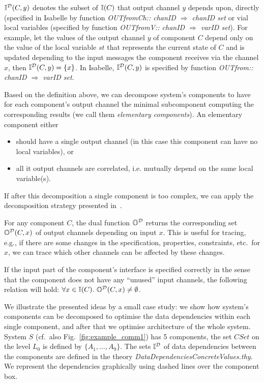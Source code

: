 $\mathbb{I}^\mathcal{D}(C, y)$ denotes the subset of $\mathbb{I}(C)$ that output channel $y$ depends upon, 
directly (specified in Isabelle by function \emph{ OUTfromCh::  chanID $\Rightarrow$ chanID set}
  or vial local variables (specified by function \emph{ OUTfromV::  chanID $\Rightarrow$ varID set}). 
For example, let the values of the output
channel $y$ of component $C$ depend only on the
value of the local variable $st$ that represents the current state of
$C$ and is updated depending to the input messages
the component receives via the channel $x$, then $\mathbb{I}^\mathcal{D}(C, y) = \{ x \}$.   
In Isabelle, $\mathbb{I}^\mathcal{D}(C, y)$  is specified by function \emph{ OUTfrom::  chanID $\Rightarrow$ varID set}.

Based on the definition above, we can decompose system's components to have for each component's output channel 
the minimal subcomponent  computing the corresponding results (we call them \emph{elementary components}). 
An elementary component either 
\begin{itemize}
\item
should have a single output channel (in this case this component can have no local variables), 
or 
\item
all it output channels are correlated, i.e. mutually depend on the same local variable(s).
\end{itemize}
%
If after this
decomposition a single component is too complex, we can apply the
decomposition strategy presented in~\cite{spichkova2011decomp}.
 
For any component $C$, the dual function $\mathbb{O}^\mathcal{D}$ returns the
corresponding set $\mathbb{O}^\mathcal{D}(C,x)$ of output channels depending on input
$x$. This is useful for tracing, e.g., 
if there are some changes in the specification, properties, constraints, etc.\ for $x$, 
we can trace which other channels can be affected by these changes.
 
%
If the input part of the component's interface is specified correctly in the
sense that the component does not have any ``unused'' input channels, the following relation
will hold: $ \forall x \in \mathbb{I}(C). ~ \mathbb{O}^\mathcal{D}(C, x) \neq
\emptyset $.

We illustrate the presented ideas by a small case study:   
we show how system's components can be decomposed to optimise
the data dependencies within each single component, and after that we optimise architecture of the whole system. 
System
$S$ (cf.\ also Fig.~\ref{fig:example_comm1}) has 5 components, the set $CSet$ on the level $L_{0}$ is
defined by $\{A_1, \dots, A_9\}$. 
The sets $\mathbb{I}^\mathcal{D}$ of data dependencies between the components are defined in the theory \emph{DataDependenciesConcreteValues.thy}. 
We represent the dependencies graphically using dashed lines over the component box.  

